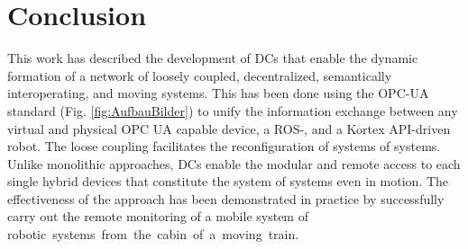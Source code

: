\documentclass[conference]{IEEEtran}
\begin{document}
\section{Conclusion}
This work has described the development of DCs that enable the dynamic formation of a network of loosely coupled, decentralized, semantically interoperating, and moving systems.  This has been done using the OPC-UA standard (Fig. \ref{fig:AufbauBilder}) to unify the information exchange between any virtual and physical OPC UA capable device, a ROS-, and a Kortex API-driven robot. The loose coupling facilitates the reconfiguration of systems of systems. Unlike monolithic approaches, DCs enable the modular and remote access to each single hybrid devices that constitute the system of systems even in motion. The effectiveness of the approach has been demonstrated in practice by successfully carry out the remote monitoring of a mobile system of \mbox{robotic systems from the cabin of a moving train.}%

\end{document}
